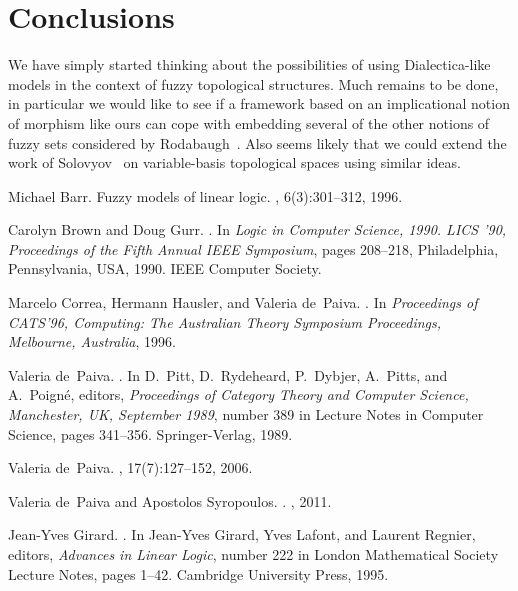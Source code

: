 \documentclass[11pt]{article}
\begin{document}
\section{Conclusions}
We have simply started thinking about the possibilities of using
Dialectica-like models in the context of fuzzy topological
structures. Much remains to be done, in particular we would like to
see if a framework based on an implicational notion of morphism like
ours can cope with embedding several of the other notions of fuzzy
sets considered by Rodabaugh~\cite{rodabaugh1983}. Also seems likely 
that we could extend the work of Solovyov~\cite{solovyov2010} on 
variable-basis topological spaces using similar ideas. 
\begin{thebibliography}{10}

Michael Barr.
\newblock Fuzzy models of linear logic.
, 6(3):301--312,
  1996.

Carolyn Brown and Doug Gurr.
.
\newblock In {\em {Logic in Computer Science, 1990. LICS '90, Proceedings of
  the Fifth Annual IEEE Symposium}}, pages 208--218, {Philadelphia,
  Pennsylvania, USA}, 1990. {IEEE Computer Society}.

Marcelo Correa, Hermann Hausler, and Valeria de~Paiva.
.
\newblock In {\em {Proceedings of CATS'96, Computing: The Australian Theory
  Symposium Proceedings, Melbourne, Australia}}, 1996.

Valeria de~Paiva.
.
\newblock In D.~Pitt, D.~Rydeheard, P.~Dybjer, A.~Pitts, and A.~Poign{\'e},
  editors, {\em {Proceedings of Category Theory and Computer Science,
  Manchester, UK, September 1989}}, number 389 in {Lecture Notes in Computer
  Science}, pages 341--356. Springer-Verlag, 1989.

Valeria de~Paiva.
, 17(7):127--152, 2006.

Valeria de~Paiva and Apostolos Syropoulos.
.
, 2011.

Jean-Yves Girard.
.
\newblock In Jean-Yves Girard, Yves Lafont, and Laurent Regnier, editors, {\em
  {Advances in Linear Logic}}, number 222 in {London Mathematical Society
  Lecture Notes}, pages 1--42. Cambridge University Press, 1995.


\end{thebibliography}
\end{document}
